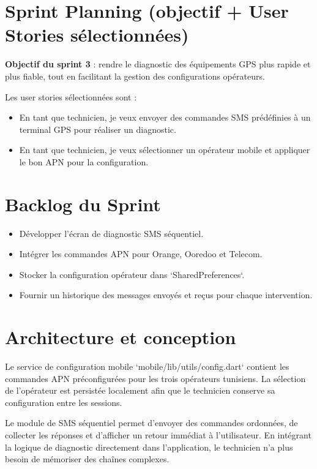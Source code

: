 \documentclass[12pt,a4paper]{report}
\begin{document}
\section{Sprint Planning (objectif + User Stories sélectionnées)}
\noindent \textbf{Objectif du sprint 3} : rendre le diagnostic des équipements GPS plus rapide et plus fiable, tout en facilitant la gestion des configurations opérateurs.

\noindent Les user stories sélectionnées sont :
\begin{itemize}
    \item En tant que technicien, je veux envoyer des commandes SMS prédéfinies à un terminal GPS pour réaliser un diagnostic.
    \item En tant que technicien, je veux sélectionner un opérateur mobile et appliquer le bon APN pour la configuration.
\end{itemize}

\section{Backlog du Sprint}
\begin{itemize}
    \item Développer l'écran de diagnostic SMS séquentiel.
    \item Intégrer les commandes APN pour Orange, Ooredoo et Telecom.
    \item Stocker la configuration opérateur dans `SharedPreferences`.
    \item Fournir un historique des messages envoyés et reçus pour chaque intervention.
\end{itemize}

\section{Architecture et conception}
\noindent Le service de configuration mobile `mobile/lib/utils/config.dart` contient les commandes APN préconfigurées pour les trois opérateurs tunisiens. La sélection de l'opérateur est persistée localement afin que le technicien conserve sa configuration entre les sessions.

\noindent Le module de SMS séquentiel permet d'envoyer des commandes ordonnées, de collecter les réponses et d'afficher un retour immédiat à l'utilisateur. En intégrant la logique de diagnostic directement dans l'application, le technicien n'a plus besoin de mémoriser des chaînes complexes.
\end{document}

